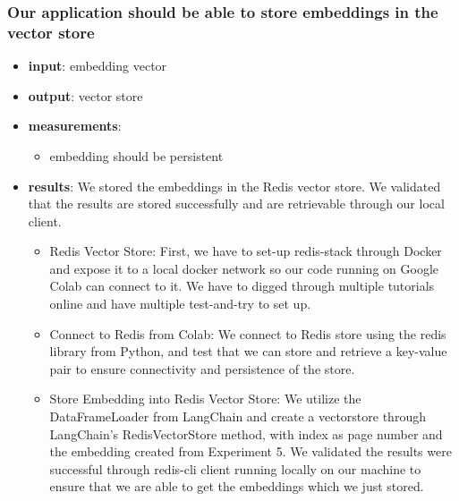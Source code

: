 \documentclass[conference]{IEEEtran}
\begin{document}
\subsubsection{Our application should be able to store embeddings in the vector store}
\begin{itemize}
    \item \textbf{input}: embedding vector
    \item \textbf{output}: vector store
    \item \textbf{measurements}:
    \begin{itemize}
        \item embedding should be persistent
    \end{itemize}
    \item \textbf{results}: We stored the embeddings in the Redis vector store. We  validated that the results are stored successfully and are retrievable through our local client.
    \begin{itemize} 
    \item Redis Vector Store: First, we have to set-up redis-stack through Docker and expose it to a local docker network so our code running on Google Colab can connect to it. We have to digged through multiple tutorials online and have multiple test-and-try to set up. 
    \item Connect to Redis from Colab: We connect to Redis store using the redis library from Python, and test that we can store and retrieve a key-value pair to ensure connectivity and persistence of the store.
    \item Store Embedding into Redis Vector Store: We utilize the DataFrameLoader from LangChain and create a vectorstore through LangChain's RedisVectorStore method, with index as page number and the embedding created from Experiment 5. We validated the results were successful through redis-cli client running locally on our machine to ensure that we are able to get the embeddings which we just stored.
    \end{itemize}
\end{itemize}
\end{document}
